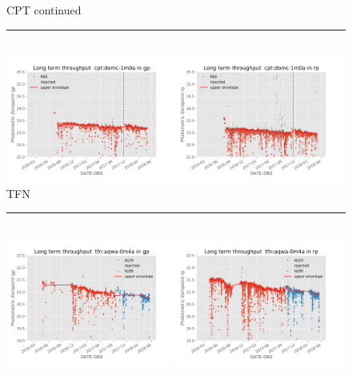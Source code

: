 \documentclass[]{spieman}
\begin{document}
\begin{figure}\ContinuedFloat
\centering
CPT continued \\ 
\rule{\textwidth}{0.4pt} \\
\includegraphics[width=0.49\textwidth]{images/photzptrend-cpt-domc-1m0a-gp.png} \hspace*{\fill} 
\includegraphics[width=0.49\textwidth]{images/photzptrend-cpt-domc-1m0a-rp.png} \\[1ex]
TFN \\ 
\rule{\textwidth}{0.4pt} \\
\includegraphics[width=0.49\textwidth]{images/photzptrend-tfn-aqwa-0m4a-gp.png} \hspace*{\fill}
\includegraphics[width=0.49\textwidth]{images/photzptrend-tfn-aqwa-0m4a-rp.png} \\

\end{figure}
\end{document}
